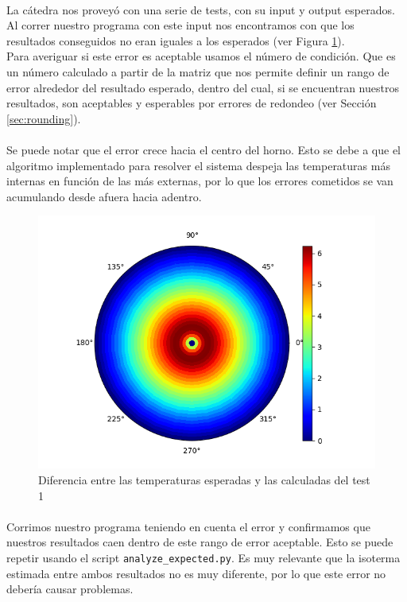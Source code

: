 \documentclass[12pt]{article}
\begin{document}
\paragraph{} La cátedra nos proveyó con una serie de tests, con su input y output esperados. Al correr nuestro programa con este input nos encontramos con que los resultados conseguidos no eran iguales a los esperados (ver Figura \ref{fig:expected.diffs}). \\
Para averiguar si este error es aceptable usamos el número de condición. Que es un número calculado a partir de la matriz que nos permite definir un rango de error alrededor del resultado esperado, dentro del cual, si se encuentran nuestros resultados, son aceptables y esperables por errores de redondeo (ver Sección \ref{sec:rounding}).

\paragraph{} Se puede notar que el error crece hacia el centro del horno. Esto se debe a que el algoritmo implementado para resolver el sistema despeja las temperaturas más internas en función de las más externas, por lo que los errores cometidos se van acumulando desde afuera hacia adentro.

\begin{figure}[H]
\centering
\includegraphics[scale=0.5]{test1.1.0.temperature}
\caption{Diferencia entre las temperaturas esperadas y las calculadas del test 1}
\label{fig:expected.diffs}
\end{figure}

\paragraph{} Corrimos nuestro programa teniendo en cuenta el error y confirmamos que nuestros resultados caen dentro de este rango de error aceptable. Esto se puede repetir usando el script \texttt{analyze\_expected.py}. Es muy relevante que la isoterma estimada entre ambos resultados no es muy diferente, por lo que este error no debería causar problemas. %
\end{document}
